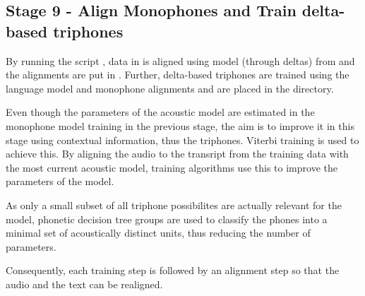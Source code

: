 \subsection{ Stage 9 - Align Monophones and Train delta-based triphones  }
By running the script , data in  is aligned using model (through deltas) from  and the alignments are put in . Further, delta-based triphones are trained using the language model  and  monophone alignments  and are placed in the  directory.

Even though the parameters of the acoustic model are estimated in the monophone model training in the previous stage, the aim is to improve it in this stage using contextual information, thus the triphones. Viterbi training is used to achieve this. By aligning the audio to the transript from the training data with the most current acoustic model, training algorithms use this to improve the parameters of the model. 


As only a small subset of all triphone possibilites are actually relevant for the model, phonetic decision tree groups are used to classify the phones into a minimal set of acoustically distinct units, thus reducing the number of parameters.

Consequently, each training step is followed by an alignment step so that the audio and the text can be realigned.




